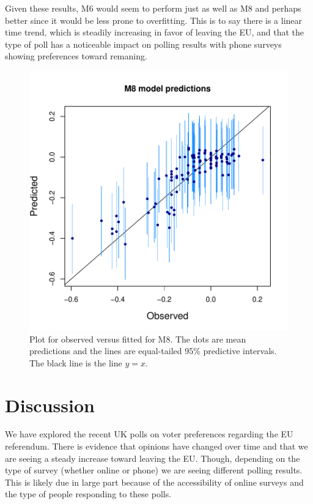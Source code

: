 \documentclass{asaproc}
\begin{document}
Given these results, M6 would seem to perform just as well as M8 and perhaps better since it would be less prone to overfitting. This is to say there is a linear time trend, which is steadily increasing in favor of leaving the EU, and that the type of poll has a noticeable impact on polling results with phone surveys showing preferences toward remaning.

\begin{figure}
\centering
\includegraphics[scale=0.53]{figs/pred_obsfit.pdf}
\caption{Plot for observed versus fitted for M8. The dots are mean predictions and the lines are equal-tailed 95\% predictive intervals. The black line is the line $y=x$.}
\label{obsfit}
\end{figure}


\section{Discussion}

We have explored the recent UK polls on voter preferences regarding the EU referendum. There is evidence that opinions have changed over time and that we are seeing a steady increase toward leaving the EU. Though, depending on the type of survey (whether online or phone) we are seeing different polling results. This is likely due in large part because of the accessibility of online surveys and the type of people responding to these polls.
\end{document}
